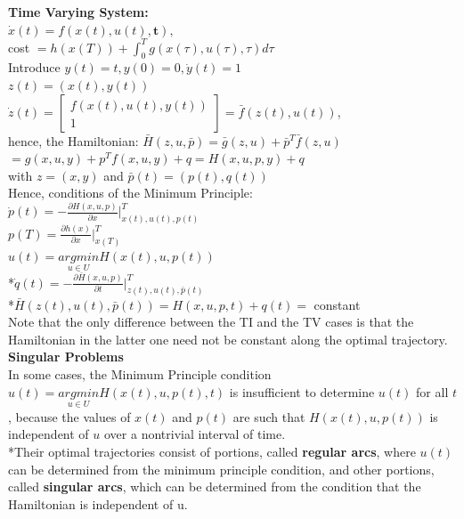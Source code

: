 \documentclass[10pt,landscape]{article}
\begin{document}
\begin{multicols*}{4}
\textbf{Time Varying System:}\\
$\dot{x}(t)=f(x(t),u(t),\textbf{t}),$ \\ 
cost $=h(x(T)) + \int_{0}^{T}g(x(\tau),u(\tau), \tau) d\tau$\\
Introduce $y(t) = t, y(0)= 0, \dot{y}(t)=1 $\\
$z(t) = (x(t),y(t))$\\

$ \dot{z}(t) = \begin{bmatrix}
	f(x(t),u(t),y(t))\\ 
	1
\end{bmatrix} = \bar{f}(z(t),u(t))$,\\
hence, the Hamiltonian: $\bar{H}(z,u,\bar{p}) = \bar{g}(z,u) + \bar{p}^T\bar{f}(z,u) $ \\ 
$= g(x,u,y) + p^T f(x,u,y) + q = H(x,u,p,y) + q$\\
with $z = (x,y)$ and $\bar{p}(t) = (p(t),q(t))$\\
Hence, conditions of the Minimum Principle:\\
$\dot{p}(t) = - \frac{\partial H(x,u,p)}{\partial x}|^T_{x(t),u(t),p(t)}$\\
$p(T) = \frac{\partial h(x)}{\partial x}|^T_{x(T)}$\\
$u(t) = \underset{u\in U}{argmin} H(x(t),u,p(t))$\\
*$\dot{q}(t) = - \frac{\partial \bar{H}(x,u,p)}{\partial t}|^T_{z(t),u(t),\bar{p}(t)}$\\
*$\bar{H}(z(t),u(t),\bar{p}(t)) = H(x,u,p,t) + q(t) = $ constant\\

Note that the only difference between the TI and the TV cases is that the Hamiltonian in the latter one need not be constant along the optimal trajectory.
\\

\textbf{Singular Problems}\\
In some cases, the Minimum Principle condition $u(t) = \underset{u\in U}{argmin} H(x(t),u,p(t),t)$ is insufficient to determine $u(t)$ for all $t$, because the values of $x(t)$ and $p(t)$ are such that $H(x(t),u,p(t))$ is independent of $u$ over a nontrivial interval of time.\\
*Their optimal trajectories consist of portions, called \textbf{regular arcs}, where $u(t)$ can be determined from the minimum principle condition, and other portions, called \textbf{singular arcs}, which can be determined from the condition that the Hamiltonian is independent of u.





\end{multicols*}
\end{document}
